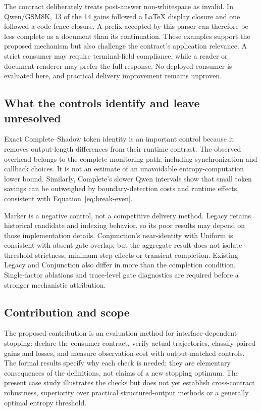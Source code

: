 \documentclass[12pt,a4paper]{article}
\begin{document}
The contract deliberately treats post-answer non-whitespace as invalid. In Qwen/GSM8K, 13 of the 14 gains followed a LaTeX display closure and one followed a code-fence closure. A prefix accepted by this parser can therefore be less complete as a document than its continuation. These examples support the proposed mechanism but also challenge the contract's application relevance. A strict consumer may require terminal-field compliance, while a reader or document renderer may prefer the full response. No deployed consumer is evaluated here, and practical delivery improvement remains unproven.

\subsection{What the controls identify and leave unresolved}
Exact Complete--Shadow token identity is an important control because it removes output-length differences from their runtime contrast. The observed overhead belongs to the complete monitoring path, including synchronization and callback choices. It is not an estimate of an unavoidable entropy-computation lower bound. Similarly, Complete's slower Qwen intervals show that small token savings can be outweighed by boundary-detection costs and runtime effects, consistent with Equation~\ref{eq:break-even}.

Marker is a negative control, not a competitive delivery method. Legacy retains historical candidate and indexing behavior, so its poor results may depend on those implementation details. Conjunction's near-identity with Uniform is consistent with absent gate overlap, but the aggregate result does not isolate threshold strictness, minimum-step effects or transient completion. Existing Legacy and Conjunction also differ in more than the completion condition. Single-factor ablations and trace-level gate diagnostics are required before a stronger mechanistic attribution.

\subsection{Contribution and scope}
The proposed contribution is an evaluation method for interface-dependent stopping: declare the consumer contract, verify actual trajectories, classify paired gains and losses, and measure observation cost with output-matched controls. The formal results specify why each check is needed; they are elementary consequences of the definitions, not claims of a new stopping optimum. The present case study illustrates the checks but does not yet establish cross-contract robustness, superiority over practical structured-output methods or a generally optimal entropy threshold.
\end{document}
